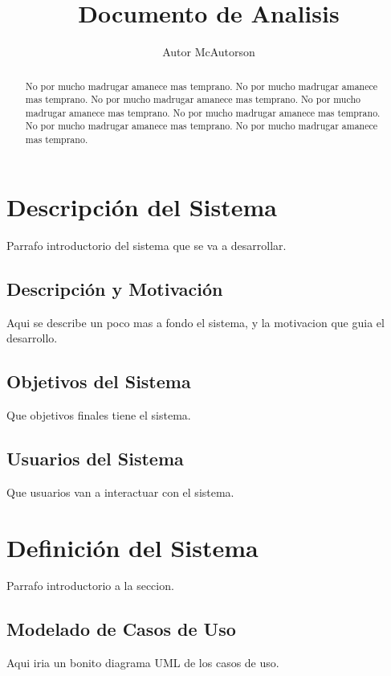 \documentclass[a4paper, spanish]{article}
\title{Documento de Analisis}
\author{Autor McAutorson}
\begin{document}
\maketitle
\begin{abstract}
No por mucho madrugar amanece mas temprano.
No por mucho madrugar amanece mas temprano.
No por mucho madrugar amanece mas temprano.
No por mucho madrugar amanece mas temprano.
No por mucho madrugar amanece mas temprano.
No por mucho madrugar amanece mas temprano.
No por mucho madrugar amanece mas temprano.
\end{abstract}
\vspace{\fill}
\tableofcontents
\let\oldsection\section\renewcommand\section{\clearpage\oldsection}

\section{Descripción del Sistema}
Parrafo introductorio del sistema que se va a desarrollar.

\subsection{Descripción y Motivación}
Aqui se describe un poco mas a fondo el sistema, y la motivacion
que guia el desarrollo.

\subsection{Objetivos del Sistema}
Que objetivos finales tiene el sistema.

\subsection{Usuarios del Sistema}
Que usuarios van a interactuar con el sistema.

\section{Definición del Sistema}
Parrafo introductorio a la seccion.

\subsection{Modelado de Casos de Uso}
Aqui iria un bonito diagrama UML de los casos de uso.
\end{document}

